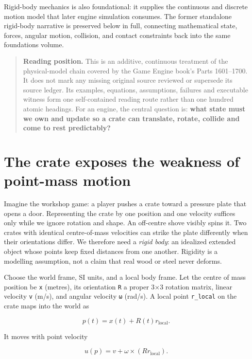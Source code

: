 Rigid-body mechanics is also foundational: it supplies the continuous and discrete motion model that later engine simulation consumes. The former standalone rigid-body narrative is preserved below in full, connecting mathematical state, forces, angular motion, collision, and contact constraints back into the same foundations volume.

\begin{quote}
\textbf{Reading position.} This is an additive, continuous treatment of the physical-model chain covered by the Game Engine book's Parts 1601--1700. It does not mark any missing original source reviewed or supersede its source ledger. Its examples, equations, assumptions, failures and executable witness form one self-contained reading route rather than one hundred atomic headings. For an engine, the central question is: \textbf{what state must we own and update so a crate can translate, rotate, collide and come to rest predictably?}
\end{quote}

\section{The crate exposes the weakness of point-mass motion}\label{02-foundations-ii-ch039-the-crate-exposes-the-weakness-of-point-mass-motion}

Imagine the workshop game: a player pushes a crate toward a pressure plate that opens a door. Representing the crate by one position and one velocity suffices only while we ignore rotation and shape. An off-centre shove visibly spins it. Two crates with identical centre-of-mass velocities can strike the plate differently when their orientations differ. We therefore need a \emph{rigid body}: an idealized extended object whose points keep fixed distances from one another. Rigidity is a modelling assumption, not a claim that real wood or steel never deforms.

Choose the world frame, SI units, and a local body frame. Let the centre of mass position be \texttt{x} (metres), its orientation \texttt{R} a proper 3×3 rotation matrix, linear velocity \texttt{v} (m/s), and angular velocity \texttt{ω} (rad/s). A local point \texttt{r\_local} on the crate maps into the world as

\[
p(t)=x(t)+R(t)r_{\mathrm{local}}.
\]

It moves with point velocity

\[
u(p)=v+\omega\times(Rr_{\mathrm{local}}).
\]

